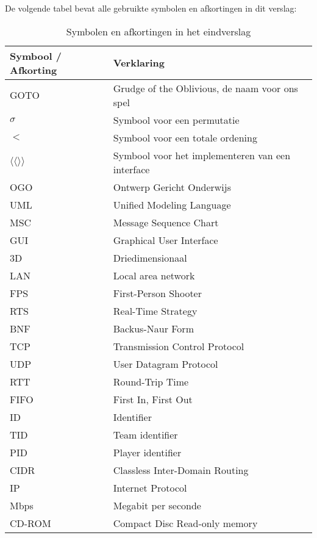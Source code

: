     De volgende tabel bevat alle gebruikte symbolen en afkortingen in dit verslag:
    \begin{table}[H]
        \small
        \centering
        \begin{tabular}{| l | l |}
        \hline
        Symbool / Afkorting & Verklaring \\ \hline
        GOTO & Grudge of the Oblivious, de naam voor ons spel \\ \hline
        $\sigma$ & Symbool voor een permutatie \\ \hline
        $<$ & Symbool voor een totale ordening \\ \hline
        $\langle\langle \rangle\rangle$ & Symbool voor het implementeren van een interface \\ \hline
        OGO & Ontwerp Gericht Onderwijs \\ \hline
        UML & Unified Modeling Language \\ \hline
        MSC & Message Sequence Chart \\ \hline
        GUI & Graphical User Interface \\ \hline
        3D & Driedimensionaal \\ \hline
        LAN & Local area network \\ \hline
        FPS & First-Person Shooter \\ \hline
        RTS & Real-Time Strategy \\ \hline
        BNF & Backus-Naur Form \\ \hline
        TCP & Transmission Control Protocol \\ \hline
        UDP & User Datagram Protocol \\ \hline
        RTT & Round-Trip Time \\ \hline
        FIFO & First In, First Out \\ \hline
        ID & Identifier \\ \hline
        TID & Team identifier \\ \hline
        PID & Player identifier \\ \hline
        CIDR & Classless Inter-Domain Routing \\ \hline
        IP & Internet Protocol \\ \hline
        Mbps & Megabit per seconde \\ \hline
        CD-ROM & Compact Disc Read-only memory \\ \hline
        \end{tabular}
        \caption{Symbolen en afkortingen in het eindverslag}
        \label{tab:planning}
    \end{table} 